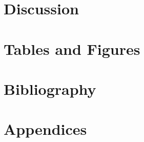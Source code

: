 \documentclass[12pt]{article}
\begin{document}
\begin{doublespacing}
\section{Discussion}

\section{Tables and Figures}

\section{Bibliography}

\section{Appendices}

\end{doublespacing}
\end{document}
